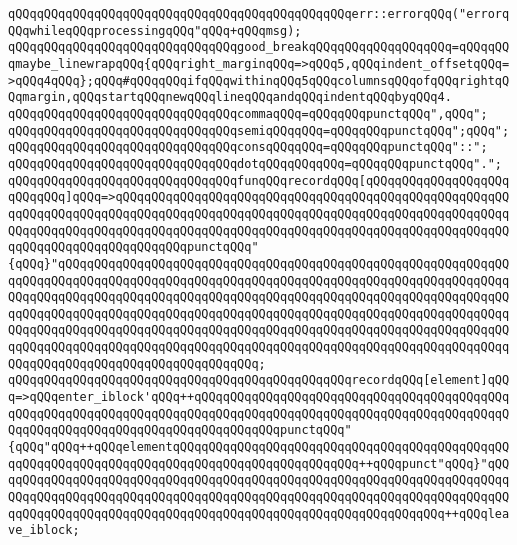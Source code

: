 \verb|qQQqqQQqqQQqqQQqqQQqqQQqqQQqqQQqqQQqqQQqqQQqqQQqerr::errorqQQq("errorqQQqwhileqQQqprocessingqQQq"qQQq+qQQqmsg);|\newline
\newline
\verb|qQQqqQQqqQQqqQQqqQQqqQQqqQQqqQQqgood_breakqQQqqQQqqQQqqQQqqQQq=qQQqqQQqmaybe_linewrapqQQq{qQQqright_marginqQQq=>qQQq5,qQQqindent_offsetqQQq=>qQQq4qQQq};qQQq#qQQqqQQqifqQQqwithinqQQq5qQQqcolumnsqQQqofqQQqrightqQQqmargin,qQQqstartqQQqnewqQQqlineqQQqandqQQqindentqQQqbyqQQq4.|\newline
\newline
\verb|qQQqqQQqqQQqqQQqqQQqqQQqqQQqqQQqcommaqQQq=qQQqqQQqpunctqQQq",qQQq";|\newline
\verb|qQQqqQQqqQQqqQQqqQQqqQQqqQQqqQQqsemiqQQqqQQq=qQQqqQQqpunctqQQq";qQQq";|\newline
\verb|qQQqqQQqqQQqqQQqqQQqqQQqqQQqqQQqconsqQQqqQQq=qQQqqQQqpunctqQQq"::";|\newline
\verb|qQQqqQQqqQQqqQQqqQQqqQQqqQQqqQQqdotqQQqqQQqqQQq=qQQqqQQqpunctqQQq".";|\newline
\newline
\verb|qQQqqQQqqQQqqQQqqQQqqQQqqQQqqQQqfunqQQqrecordqQQq[qQQqqQQqqQQqqQQqqQQqqQQqqQQq]qQQq=>qQQqqQQqqQQqqQQqqQQqqQQqqQQqqQQqqQQqqQQqqQQqqQQqqQQqqQQqqQQqqQQqqQQqqQQqqQQqqQQqqQQqqQQqqQQqqQQqqQQqqQQqqQQqqQQqqQQqqQQqqQQqqQQqqQQqqQQqqQQqqQQqqQQqqQQqqQQqqQQqqQQqqQQqqQQqqQQqqQQqqQQqqQQqqQQqqQQqqQQqqQQqqQQqqQQqqQQqqQQqpunctqQQq"{qQQq}"qQQqqQQqqQQqqQQqqQQqqQQqqQQqqQQqqQQqqQQqqQQqqQQqqQQqqQQqqQQqqQQqqQQqqQQqqQQqqQQqqQQqqQQqqQQqqQQqqQQqqQQqqQQqqQQqqQQqqQQqqQQqqQQqqQQqqQQqqQQqqQQqqQQqqQQqqQQqqQQqqQQqqQQqqQQqqQQqqQQqqQQqqQQqqQQqqQQqqQQqqQQqqQQqqQQqqQQqqQQqqQQqqQQqqQQqqQQqqQQqqQQqqQQqqQQqqQQqqQQqqQQqqQQqqQQqqQQqqQQqqQQqqQQqqQQqqQQqqQQqqQQqqQQqqQQqqQQqqQQqqQQqqQQqqQQqqQQqqQQqqQQqqQQqqQQqqQQqqQQqqQQqqQQqqQQqqQQqqQQqqQQqqQQqqQQqqQQqqQQqqQQqqQQqqQQqqQQqqQQqqQQqqQQqqQQqqQQqqQQqqQQqqQQq;|\newline
\verb|qQQqqQQqqQQqqQQqqQQqqQQqqQQqqQQqqQQqqQQqqQQqqQQqrecordqQQq[element]qQQq=>qQQqenter_iblock'qQQq++qQQqqQQqqQQqqQQqqQQqqQQqqQQqqQQqqQQqqQQqqQQqqQQqqQQqqQQqqQQqqQQqqQQqqQQqqQQqqQQqqQQqqQQqqQQqqQQqqQQqqQQqqQQqqQQqqQQqqQQqqQQqqQQqqQQqqQQqqQQqqQQqqQQqqQQqpunctqQQq"{qQQq"qQQq++qQQqelementqQQqqQQqqQQqqQQqqQQqqQQqqQQqqQQqqQQqqQQqqQQqqQQqqQQqqQQqqQQqqQQqqQQqqQQqqQQqqQQqqQQqqQQqqQQqqQQq++qQQqpunct"qQQq}"qQQqqQQqqQQqqQQqqQQqqQQqqQQqqQQqqQQqqQQqqQQqqQQqqQQqqQQqqQQqqQQqqQQqqQQqqQQqqQQqqQQqqQQqqQQqqQQqqQQqqQQqqQQqqQQqqQQqqQQqqQQqqQQqqQQqqQQqqQQqqQQqqQQqqQQqqQQqqQQqqQQqqQQqqQQqqQQqqQQqqQQqqQQqqQQqqQQqqQQqqQQq++qQQqleave_iblock;|\newline
